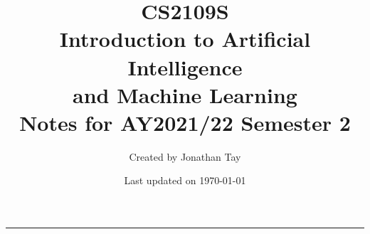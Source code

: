 \documentclass{article}
\title{\textbf{CS2109S \\[0.25em] Introduction to Artificial Intelligence \\ and Machine Learning} \\[2em] \Large Notes for AY2021/22 Semester 2 \\[1em]}
\author{Created by Jonathan Tay}
\date{Last updated on \today}
\newcommand{\pageline}[1]{\par\noindent\rule{\textwidth}{#1}}
\begin{document}
    \maketitle
    \pageline{1.5pt}
    \renewcommand{\baselinestretch}{0.75}\normalsize
    \tableofcontents
    \newpage
    \renewcommand{\baselinestretch}{1.15}\normalsize

    \begin{multicols*}{2}
        
    \end{multicols*}
\end{document}
